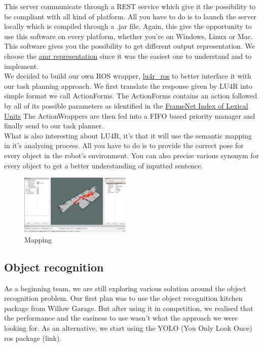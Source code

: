 \documentclass[runningheads,a4paper]{llncs}
\begin{document}
This server communicate through a REST service which give it the possibility to be compliant with all kind of platform. All you have to do is to launch the server locally which is compiled through a .jar file. Again, this give the opportunity to use this software on every platform, whether you’re on Windows, Linux or Mac. \\

This software gives you the possibility to get different output representation. We choose the \href{https://github.com/amrisi/amr-guidelines/blob/master/amr.md}{amr representation} since it was the easiest one to understand and to implement.\\

We decided to build our own ROS wrapper, \href{https://github.com/WalkingMachine/lu4r_ros}{lu4r\_ros}  to better interface it with our task planning approach. We first translate the response given by LU4R into simple format we call ActionForms. The ActionForms contains an action followed by all of its possible parameters as identified in the \href{https://framenet2.icsi.berkeley.edu/fnReports/data/luIndex.xml}{FrameNet Index of Lexical Units}
The ActionWrappers are then fed into a FIFO based priority manager and finally send to our task planner.\\

What is also interesting about LU4R, it’s that it will use the semantic mapping in it’s analysing process. All you have to do is to provide the correct pose for every object in the robot’s environment. You can also precise various synonym for every object to get a better understanding of inputted sentence.\\

\ifdraft
\begin{figure}
  \centering
  \includegraphics[width=150pt]{images/map.jpg}
  \caption{Mapping}
\end{figure}
\fi



\subsection{Object recognition}
\tab As a beginning team, we are still exploring various solution around the object recognition problem. Our first plan was to use the object recognition kitchen package from Willow Garage. But after using it in competition, we realised that the performance and the easiness to use wasn’t what the approach we were looking for. As an alternative, we start using the YOLO (You Only Look Once) ros package (link). \\
\end{document}
